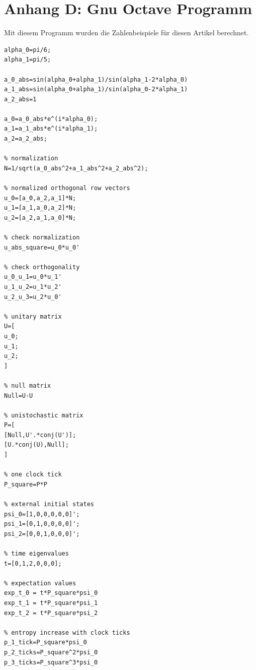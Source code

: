 \documentclass[12pt]{article}
\begin{document}
\newpage
\section{Anhang D: Gnu Octave Programm}
Mit diesem Programm wurden die Zahlenbeispiele für diesen Artikel berechnet.
\begin{verbatim}
alpha_0=pi/6;
alpha_1=pi/5;

a_0_abs=sin(alpha_0+alpha_1)/sin(alpha_1-2*alpha_0)
a_1_abs=sin(alpha_0+alpha_1)/sin(alpha_0-2*alpha_1)
a_2_abs=1

a_0=a_0_abs*e^(i*alpha_0);
a_1=a_1_abs*e^(i*alpha_1);
a_2=a_2_abs;

% normalization
N=1/sqrt(a_0_abs^2+a_1_abs^2+a_2_abs^2);

% normalized orthogonal row vectors
u_0=[a_0,a_2,a_1]*N;
u_1=[a_1,a_0,a_2]*N;
u_2=[a_2,a_1,a_0]*N;

% check normalization
u_abs_square=u_0*u_0'

% check orthogonality
u_0_u_1=u_0*u_1'
u_1_u_2=u_1*u_2'
u_2_u_3=u_2*u_0'

% unitary matrix
U=[
u_0;
u_1;
u_2;
]

% null matrix
Null=U-U

% unistochastic matrix
P=[
[Null,U'.*conj(U')];
[U.*conj(U),Null];
]

% one clock tick
P_square=P*P

% external initial states
psi_0=[1,0,0,0,0,0]';
psi_1=[0,1,0,0,0,0]';
psi_2=[0,0,1,0,0,0]';

% time eigenvalues
t=[0,1,2,0,0,0];

% expectation values
exp_t_0 = t*P_square*psi_0
exp_t_1 = t*P_square*psi_1
exp_t_2 = t*P_square*psi_2

% entropy increase with clock ticks
p_1_tick=P_square*psi_0
p_2_ticks=P_square^2*psi_0
p_3_ticks=P_square^3*psi_0
\end{verbatim}
\end{document}
